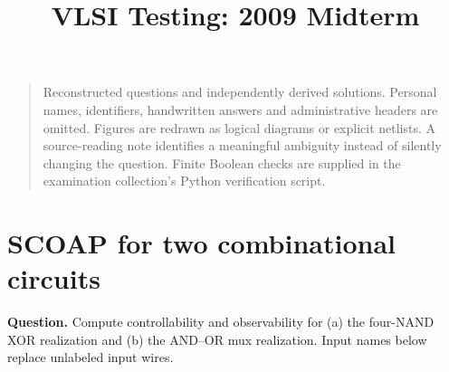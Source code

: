 \documentclass[11pt]{article}
\begin{document}
\title{VLSI Testing: 2009 Midterm}\author{}\date{}\maketitle\begin{quote}\small
Reconstructed questions and independently derived solutions. Personal names, identifiers,
handwritten answers and administrative headers are omitted. Figures are redrawn as
logical diagrams or explicit netlists. A source-reading note identifies a meaningful
ambiguity instead of silently changing the question. Finite Boolean checks
are supplied in the examination collection's Python verification script.
\end{quote}

\section{SCOAP for two combinational circuits}
\textbf{Question.} Compute controllability and observability for
(a) the four-NAND XOR realization and (b) the AND--OR mux realization.
Input names below replace unlabeled input wires.
\end{document}

